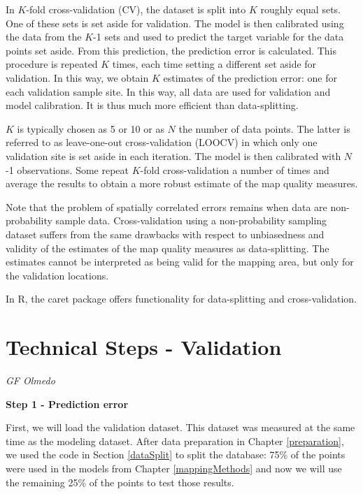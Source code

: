 \documentclass[10pt,b5paper,]{book}
\theoremstyle{definition}
\theoremstyle{definition}
\theoremstyle{definition}
\theoremstyle{remark}
\begin{document}
In \(K\)-fold cross-validation (CV), the dataset is split into \(K\)
roughly equal sets. One of these sets is set aside for validation. The
model is then calibrated using the data from the \(K\)-1 sets and used
to predict the target variable for the data points set aside. From this
prediction, the prediction error is calculated. This procedure is
repeated \(K\) times, each time setting a different set aside for
validation. In this way, we obtain \(K\) estimates of the prediction
error: one for each validation sample site. In this way, all data are
used for validation and model calibration. It is thus much more
efficient than data-splitting.

\(K\) is typically chosen as 5 or 10 or as \(N\) the number of data
points. The latter is referred to as leave-one-out cross-validation
(LOOCV) in which only one validation site is set aside in each
iteration. The model is then calibrated with \(N\)-1 observations. Some
repeat \(K\)-fold cross-validation a number of times and average the
results to obtain a more robust estimate of the map quality measures.

Note that the problem of spatially correlated errors remains when data
are non-probability sample data. Cross-validation using a
non-probability sampling dataset suffers from the same drawbacks with
respect to unbiasedness and validity of the estimates of the map quality
measures as data-splitting. The estimates cannot be interpreted as being
valid for the mapping area, but only for the validation locations.

In R, the caret package \citep{kuhn2016short} offers functionality for
data-splitting and cross-validation.

\hypertarget{TS:validation}{%
\section{Technical Steps - Validation}\label{TS:validation}}

\emph{GF Olmedo}

\textbf{Step 1 - Prediction error}

First, we will load the validation dataset. This dataset was measured at
the same time as the modeling dataset. After data preparation in Chapter
\ref{preparation}, we used the code in Section \ref{dataSplit} to split
the database: 75\% of the points were used in the models from Chapter
\ref{mappingMethods} and now we will use the remaining 25\% of the
points to test those results.
\end{document}
